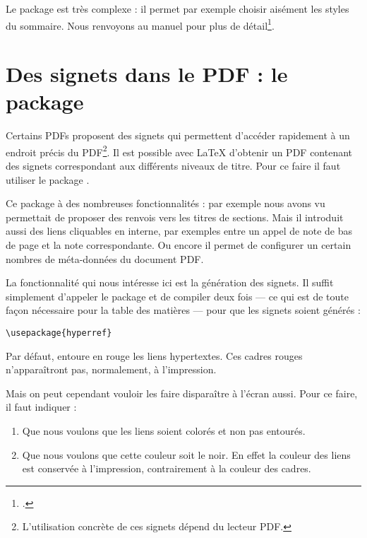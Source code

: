 Le package  est très complexe : il permet par exemple choisir aisément les styles du sommaire. Nous renvoyons au manuel pour plus de détail\footcites{minitoc}[en particulier][]{minitoc_typesetting}.

\section{Des signets dans le PDF : le package }\label{hyperref}

Certains PDFs proposent des signets qui permettent d'accéder rapidement à un endroit précis du PDF\footnote{L'utilisation concrète de ces signets dépend du lecteur PDF.}. Il est possible avec \LaTeX{} d'obtenir un PDF contenant des signets correspondant aux différents niveaux de titre. Pour ce faire il faut utiliser le package .

Ce package à des nombreuses fonctionnalités : par exemple nous avons vu  permettait de proposer des renvois vers les titres de sections.
Mais il introduit aussi des liens cliquables en interne, par exemples entre un appel de note de bas de page et la note correspondante. Ou encore il permet de configurer un certain nombres de méta-données du document PDF.

La fonctionnalité qui nous intéresse ici est la génération des signets. Il suffit simplement d'appeler le package et de compiler deux fois --- ce qui est de toute façon nécessaire pour la table des matières --- pour que les signets soient générés :

\begin{verbatim}
\usepackage{hyperref}
\end{verbatim}

Par défaut,  entoure en rouge les liens hypertextes. Ces cadres rouges n'apparaîtront pas, normalement, à l'impression.

Mais on peut cependant vouloir les faire disparaître à l'écran aussi. Pour ce faire, il faut indiquer :
\begin{enumerate}
\item Que nous voulons que les liens soient colorés et non pas entourés.
\item Que nous voulons que cette couleur soit le noir. En effet la couleur des liens est conservée à l'impression, contrairement à la couleur des cadres.
\end{enumerate}

